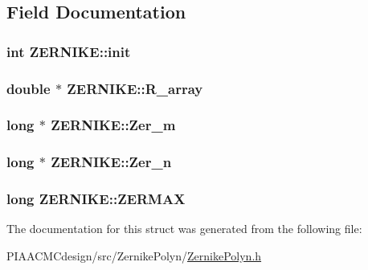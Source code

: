 \subsection{Field Documentation}
\hypertarget{structZERNIKE_aac9ea666bbfdae8b71b4bff01617b2c2}{
\subsubsection[{init}]{\setlength{\rightskip}{0pt plus 5cm}int Z\+E\+R\+N\+I\+K\+E\+::init}}\label{structZERNIKE_aac9ea666bbfdae8b71b4bff01617b2c2}
\hypertarget{structZERNIKE_aa9e9284d2a3580d31d3d9b35fa4d2b25}{
\subsubsection[{R\+\_\+array}]{\setlength{\rightskip}{0pt plus 5cm}double $\ast$ Z\+E\+R\+N\+I\+K\+E\+::\+R\+\_\+array}}\label{structZERNIKE_aa9e9284d2a3580d31d3d9b35fa4d2b25}
\hypertarget{structZERNIKE_a5e2bbe4eed60483ff115a9661462cff9}{
\subsubsection[{Zer\+\_\+m}]{\setlength{\rightskip}{0pt plus 5cm}long $\ast$ Z\+E\+R\+N\+I\+K\+E\+::\+Zer\+\_\+m}}\label{structZERNIKE_a5e2bbe4eed60483ff115a9661462cff9}
\hypertarget{structZERNIKE_a144847f36a12051560840131c95ddd0e}{
\subsubsection[{Zer\+\_\+n}]{\setlength{\rightskip}{0pt plus 5cm}long $\ast$ Z\+E\+R\+N\+I\+K\+E\+::\+Zer\+\_\+n}}\label{structZERNIKE_a144847f36a12051560840131c95ddd0e}
\hypertarget{structZERNIKE_a2c37fde142f459b1374da2472151ee29}{
\subsubsection[{Z\+E\+R\+M\+A\+X}]{\setlength{\rightskip}{0pt plus 5cm}long Z\+E\+R\+N\+I\+K\+E\+::\+Z\+E\+R\+M\+A\+X}}\label{structZERNIKE_a2c37fde142f459b1374da2472151ee29}


The documentation for this struct was generated from the following file\+:\begin{DoxyCompactItemize}
\item 
P\+I\+A\+A\+C\+M\+Cdesign/src/\+Zernike\+Polyn/\hyperlink{PIAACMCdesign_2src_2ZernikePolyn_2ZernikePolyn_8h}{Zernike\+Polyn.\+h}\end{DoxyCompactItemize}
